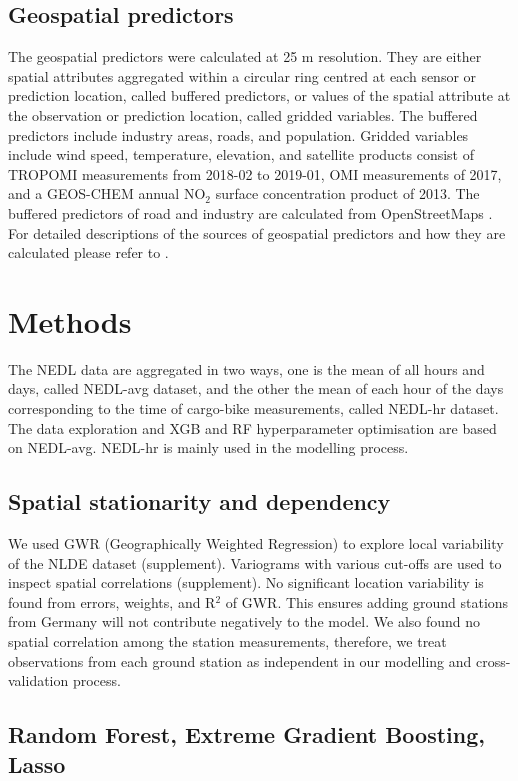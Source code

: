 \documentclass{article}
\begin{document}
\subsection{Geospatial predictors}
 The geospatial predictors were calculated at 25 m resolution. They are either spatial attributes aggregated within a circular ring centred at each sensor or prediction location, called buffered predictors, or values of the spatial attribute at the observation or prediction location, called gridded variables. The buffered predictors include industry areas, roads, and population. Gridded variables include wind speed, temperature, elevation, and satellite products consist of TROPOMI measurements from 2018-02 to 2019-01, OMI measurements of 2017, and a GEOS-CHEM \citep{bey2001global,GEOS-CHEM} annual NO$_2$ surface concentration product \citep{geddes2016long} of 2013. The buffered predictors of road and industry are calculated from OpenStreetMaps \citep{openstreetmap}. For detailed descriptions of the sources of geospatial predictors and how they are calculated please refer to \cite{luglobal}.   
  
\section{Methods}
The NEDL data are aggregated in two ways, one is the mean of all hours and days, called NEDL-avg dataset, and the other the mean of each hour of the days corresponding to the time of cargo-bike measurements, called NEDL-hr dataset. The data exploration and XGB and RF hyperparameter optimisation are based on NEDL-avg. NEDL-hr is mainly used in the modelling process. 

\subsection{Spatial stationarity and dependency}
We used GWR (Geographically Weighted Regression) to explore local variability of the NLDE dataset (supplement). Variograms with various cut-offs are used to inspect spatial correlations (supplement). No significant location variability is found from errors, weights, and R$^2$ of GWR. This ensures adding ground stations from Germany will not contribute negatively to the model. We also found no spatial correlation among the station measurements, therefore, we treat observations from each ground station as independent in our modelling and cross-validation process. 

\subsection{Random Forest, Extreme Gradient Boosting, Lasso}
\end{document}
